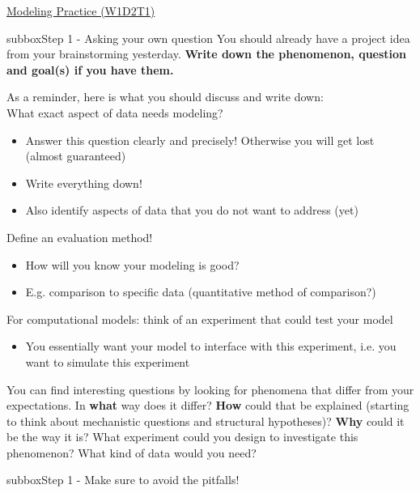 \begin{textbox}{\href{https://compneuro.neuromatch.io/tutorials/W1D2_ModelingPractice/W1D2_Intro.html}{Modeling Practice  (W1D2T1)} }

\begin{subbox}{subbox}{Step 1 - Asking your own question }
\scriptsize
You should already have a project idea from your brainstorming yesterday. \textbf{Write down the phenomenon, question and goal(s) if you have them.} 

As a reminder, here is what you should discuss and write down:\\
  What exact aspect of data needs modeling?
  \begin{itemize}
    \item Answer this question clearly and precisely!
Otherwise you will get lost (almost guaranteed)
  \item Write everything down!
  \item  Also identify aspects of data that you do not want to address (yet)
  \end{itemize}
  
Define an evaluation method!
  \begin{itemize}
    \item How will you know your modeling is good?
     \item E.g. comparison to specific data (quantitative method of comparison?)
    \end{itemize}
 For computational models: think of an experiment that could test your model
\begin{itemize}
    \item
   You essentially want your model to interface with this experiment, i.e. you want to simulate this experiment
  
\end{itemize}

You can find interesting questions by looking for phenomena that differ from your expectations. In \textbf{what} way does it differ? \textbf{How} could that be explained (starting to think about mechanistic questions and structural hypotheses)? \textbf{Why} could it be the way it is? What experiment could you design to investigate this phenomenon? What kind of data would you need?

\end{subbox}

\begin{subbox}{subbox}{Step 1 - Make sure to avoid the pitfalls! }
\scriptsize


\end{subbox}
\end{textbox}
